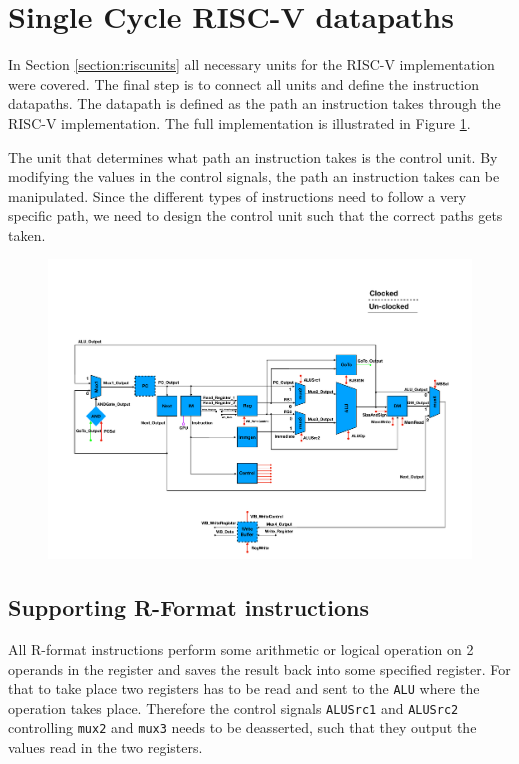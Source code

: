 \section{Single Cycle RISC-V datapaths}\label{section:Datapaths}
    In Section \ref{section:riscunits} all necessary units for the RISC-V implementation were covered. The final step is to connect all units and define the instruction datapaths. The datapath is defined as the path an instruction takes through the RISC-V implementation. The full implementation is illustrated in Figure \ref{fig:RISCV}. 
    
    The unit that determines what path an instruction takes is the control unit. By modifying the values in the control signals, the path an instruction takes can be manipulated. Since the different types of instructions need to follow a very specific path, we need to design the control unit such that the correct paths gets taken.
    
    \begin{figure}[h!]
        \hspace*{-3.8cm}
        \centering
        \includegraphics[scale=0.8]{pictures/RISCV.pdf}
        \caption{}
        \label{fig:RISCV}
    \end{figure} 

    \subsection{Supporting R-Format instructions}\label{section:Rformat}
        All R-format instructions perform some arithmetic or logical operation on 2 operands in the register and saves the result back into some specified register. For that to take place two registers has to be read and sent to the \texttt{ALU} where the operation takes place. Therefore the control signals \texttt{ALUSrc1} and \texttt{ALUSrc2} controlling \texttt{mux2} and \texttt{mux3} needs to be deasserted, such that they output the values read in the two registers. 
        
